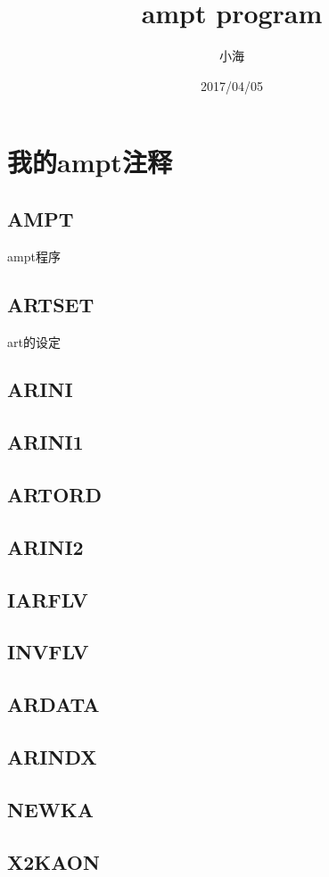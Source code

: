 \documentclass[10pt,UTF8]{ctexbook}
\author{小海}
\date{2017/04/05}
\title{ampt program}
\begin{document}
\maketitle
\tableofcontents

\chapter{我的ampt注释}

\section{AMPT}
ampt程序

\section{ARTSET}
art的设定
\section{ARINI}
\section{ARINI1}
\section{ARTORD}
\section{ARINI2}
\section{IARFLV}
\section{INVFLV}
\section{ARDATA}
\section{ARINDX}
\section{NEWKA}
\section{X2KAON}
\end{document}
